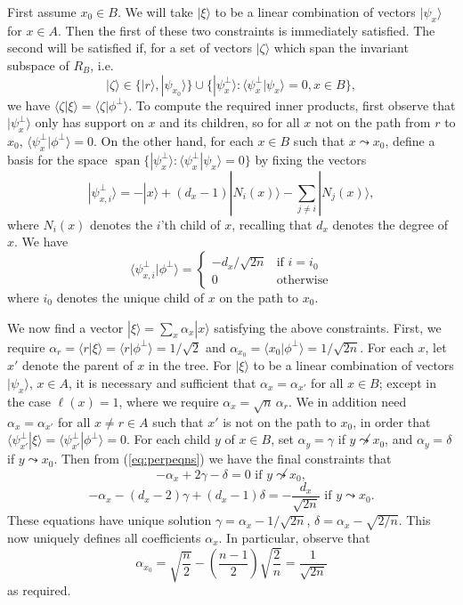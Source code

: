 \documentclass[11pt]{article}
\newcommand{\ket}[1]{| #1 \rangle}
\newcommand{\ip}[2]{\langle #1|#2 \rangle}
\DeclareMathOperator{\spann}{span}
\newcommand{\be}{\begin{equation}}
\newcommand{\ee}{\end{equation}}
\begin{document}
First assume $x_0 \in B$. We will take $\ket{\xi}$ to be a linear combination of vectors $\ket{\psi_x}$ for $x \in A$. Then the first of these two constraints is immediately satisfied. The second will be satisfied if, for a set of vectors $\ket{\zeta}$ which span the invariant subspace of $R_B$, i.e.
%
\[ \ket{\zeta} \in \{ \ket{r}, \ket{\psi_{x_0}} \} \cup \{ \ket{\psi^\perp_x}: \ip{\psi^\perp_x}{\psi_x} = 0, x \in B \}, \]
%
we have $\ip{\zeta}{\xi} = \ip{\zeta}{\phi^\perp}$. To compute the required inner products, first observe that $\ket{\psi^\perp_x}$ only has support on $x$ and its children, so for all $x$ not on the path from $r$ to $x_0$, $\ip{\psi^\perp_x}{\phi^\perp} = 0$. On the other hand, for each $x \in B$ such that $x \leadsto x_0$, define a basis for the space $\spann \{ \ket{\psi^\perp_x}: \ip{\psi^\perp_x}{\psi_x} = 0 \}$ by fixing the vectors
%
\[ \ket{\psi^\perp_{x,i}} = -\ket{x} + (d_x-1) \ket{N_i(x)} - \sum_{j \neq i} \ket{N_j(x)}, \]
%
where $N_i(x)$ denotes the $i$'th child of $x$, recalling that $d_x$ denotes the degree of $x$. We have
%
\be \label{eq:perpeqns} \ip{\psi^\perp_{x,i}}{\phi^\perp} = \begin{cases} -d_x/\sqrt{2n} & \text{if } i = i_0 \\ 0 & \text{otherwise} \end{cases} \ee
%
where $i_0$ denotes the unique child of $x$ on the path to $x_0$. 

We now find a vector $\ket{\xi} = \sum_x \alpha_x \ket{x}$ satisfying the above constraints. First, we require $\alpha_r = \ip{r}{\xi} = \ip{r}{\phi^\perp} = 1/\sqrt{2}$ and $\alpha_{x_0} = \ip{x_0}{\phi^\perp} = 1/\sqrt{2n}$. For each $x$, let $x'$ denote the parent of $x$ in the tree. For $\ket{\xi}$ to be a linear combination of vectors $\ket{\psi_x}$, $x \in A$, it is necessary and sufficient that $\alpha_x = \alpha_{x'}$ for all $x \in B$; except in the case $\ell(x) = 1$, where we require $\alpha_x = \sqrt{n}\,\alpha_r$. We in addition need $\alpha_x = \alpha_{x'}$ for all $x \neq r \in A$ such that $x'$ is not on the path to $x_0$, in order that $\ip{\psi^\perp_{x'}}{\xi} = \ip{\psi^\perp_{x'}}{\phi^\perp} = 0$. For each child $y$ of $x \in B$, set $\alpha_y = \gamma$ if $y \not\leadsto x_0$, and $\alpha_y = \delta$ if $y \leadsto x_0$. Then from (\ref{eq:perpeqns}) we have the final constraints that
%
\[ -\alpha_x + 2\gamma - \delta = 0 \text{ if } y \not\leadsto x_0, \]
\[ -\alpha_x - (d_x-2)\gamma + (d_x-1)\delta = -\frac{d_x}{\sqrt{2n}} \text{ if } y \leadsto x_0. \]
%
These equations have unique solution $\gamma = \alpha_x - 1/\sqrt{2n}$, $\delta = \alpha_x - \sqrt{2/n}$. This now uniquely defines all coefficients $\alpha_x$. In particular, observe that
%
\[ \alpha_{x_0} = \sqrt{\frac{n}{2}} - \left(\frac{n-1}{2}\right)\sqrt{\frac{2}{n}} = \frac{1}{\sqrt{2n}} \]
%
as required.
\end{document}
